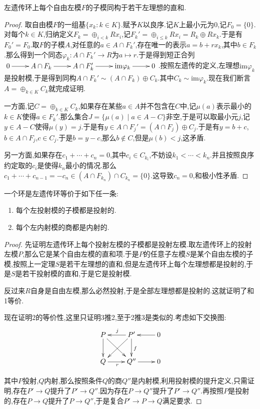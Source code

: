 左遗传环上每个自由左模$F$的子模同构于若干左理想的直和.
\begin{proof}
	
	取自由模$F$的一组基$\{x_k:k\in K\}$.赋予$K$以良序.记$K$上最小元为0,记$F_0=\{0\}$.对每个$k\in K$,归纳定义$F_k=\oplus_{i<k}Rx_i$,记$F_k'=\oplus_{i\le k}Rx_i=R_k\oplus Rx_k$.于是有$F_0'=F_0$.取$F$的子模$A$,对任意的$a\in A\cap F_k'$,存在唯一的表示$a=b+rx_k$,其中$b\in F_k$.那么得到一个同态$\varphi_k:A\cap F_k'\to R$为$a\mapsto r$.于是得到短正合列$\xymatrix{0\ar[r]&A\cap F_k\ar[r]&A\cap F_k'\ar[r]&\mathrm{im}\varphi_k\ar[r]&0}$.按照左遗传的定义,左理想$\mathrm{im}\varphi_k$是投射模,于是得到同构$A\cap F_k'\sim (A\cap F_k)\oplus C_k$.其中$C_k\sim\mathrm{im}\varphi_k$.现在我们断言$A=\oplus_ {k\in K}C_k$就完成证明.
	
	一方面,记$C=\oplus_{k\in K}C_k$,如果存在某些$a\in A$并不包含在$C$中,记$\mu(a)$表示最小的$k\in K$使得$a\in F_k'$.那么集合$J=\{\mu(a)\mid a\in A-C\}$非空,于是可以取最小元$j$,记$y\in A-C$使得$\mu(y)=j$.于是有$y\in A\cap F_j'=(A\cap F_j)\oplus C_j$.于是有$y=b+c$,$b\in A\cap F_j$,$c\in C_j$.于是$b=y-c$,那么$b\not\in C$,但是$\mu(b)<j$,这矛盾.
	
	另一方面,如果存在$c_1+\cdots+c_n=0$,其中$c_i\in C_{k_i}$,不妨设$k_1<\cdots<k_n$.并且按照良序约定取的$c_i$是使得$k_n$最小的情况.那么$c_1+\cdots+c_ {n-1}=-c_n\in(A\cap F_{k_n})\cap C_{k_n}=\{0\}$.这导致$c_n=0$,和极小性矛盾.
\end{proof}

一个环是左遗传环等价于如下任一条:
\begin{enumerate}
	\item 每个左投射模的子模都是投射的.
	\item 每个左内射模的商都是内射的.
\end{enumerate}
\begin{proof}
	
	先证明左遗传环上每个投射左模的子模都是投射左模.取左遗传环上的投射左模$P$,那么它是某个自由左模的直和项.于是$P$的任意子左模$S$是某个自由左模的子模,按照上一定理$S$是若干左理想的直和,但是左遗传环上每个左理想都是投射的,于是$S$是若干投射模的直和,于是它是投射模.
	
	反过来$R$自身是自由左模,那么必然投射,于是全部左理想都是投射的.这就证明了和1等价.
	
	现在证明2的等价性,这里只证明3推2,至于2推3是类似的.考虑如下交换图:
	$$\xymatrix{
		P\ar[d]\ar[dr]&P'\ar[l]_j\ar[d]^f\ar[dl]&0\ar[l]\\
		Q\ar[r]_r&Q''\ar[r]&0
	}$$
	
	其中$P$投射,$Q$内射,那么按照条件$Q$的商$Q''$是内射模,利用投射模的提升定义,只需证明,存在$P'\to Q$提升了$P'\to Q''$.因为存在$P\to Q''$提升了$P'\to Q''$.再按照$P$是投射的,存在$P\to Q$提升了$P\to Q''$,于是复合$P'\to P\to Q$满足要求.
\end{proof}

